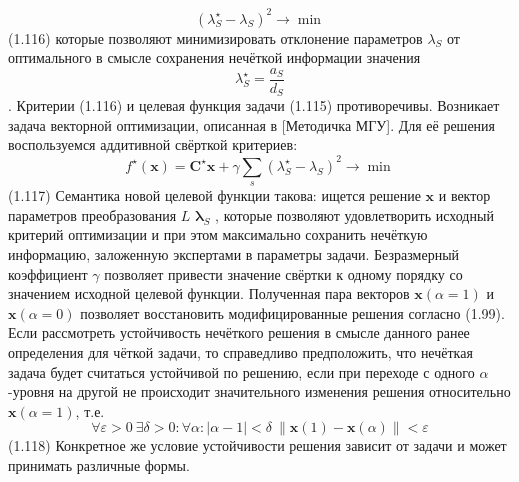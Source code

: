 	\[{{\left( \lambda _{S}^{\star}-{{\lambda }_{S}} \right)}^{2}}\to \min \] 	(1.116)
которые позволяют минимизировать отклонение параметров ${{\lambda }_{S}}$ от оптимального в смысле сохранения нечёткой информации значения \[\lambda _{S}^{\star}=\frac{{{a}_{S}}}{{{d}_{S}}}\]. Критерии (1.116) и целевая функция задачи (1.115) противоречивы. Возникает задача векторной оптимизации, описанная в [Методичка МГУ]. Для её решения воспользуемся аддитивной свёрткой критериев:
	\[{{f}^{\star}}\left( \mathbf{x} \right)={{\mathbf{C}}^{\star}}\mathbf{x}+\gamma \sum\limits_{s}^{{}}{{{\left( \lambda _{S}^{\star}-{{\lambda }_{S}} \right)}^{2}}\to \min }\] 	(1.117)
Семантика новой целевой функции такова: ищется решение $\mathbf{x}$ и вектор параметров преобразования $L$ ${{\mathbf{\lambda }}_{S}}$ , которые позволяют удовлетворить исходный критерий оптимизации и при этом максимально сохранить нечёткую информацию, заложенную экспертами в параметры задачи. Безразмерный коэффициент $\gamma$ позволяет привести значение свёртки к одному порядку со значением исходной целевой функции.
Полученная пара векторов $\mathbf{x}\left( \alpha =1 \right)$ и $\mathbf{x}\left( \alpha =0 \right)$ позволяет восстановить модифицированные решения согласно (1.99). Если рассмотреть устойчивость нечёткого решения в смысле данного ранее определения для чёткой задачи, то справедливо предположить, что нечёткая задача будет считаться устойчивой по решению, если при переходе с одного $\alpha$-уровня на другой не происходит значительного изменения решения относительно $\mathbf{x}\left( \alpha =1 \right)$, т.е.
	\[\forall \varepsilon >0\ \exists \delta >0:\forall \alpha :\left| \alpha -1 \right|<\delta \ \left\| \mathbf{x}\left( 1 \right)-\mathbf{x}\left( \alpha  \right) \right\|<\varepsilon \] 	(1.118)
Конкретное же условие устойчивости решения зависит от задачи и может принимать различные формы.

